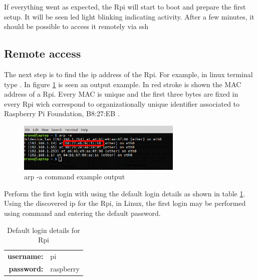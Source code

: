 If everything went as expected, the \gls{Rpi} will start to boot and prepare the first setup. It will be seen led light blinking indicating activity. After a few minutes, it should be possible to access it remotely via ssh


\subsection{Remote access}
The next step is to find the ip address of the \gls{Rpi}. For example, in linux terminal type . In figure \ref{arp_example} is seen an output example. In red stroke is shown the \gls{MAC} address of a \gls{Rpi}. Every \gls{MAC} is unique and the first three bytes are fixed in every \gls{Rpi} wich correspond to organizationally unique identifier \cite{mac_wiki} associated to Raspberry Pi Foundation, B8:27:EB \cite{wireshark_mac}.

\begin{figure}[hb]
	\centering
	\includegraphics[width=0.7\textwidth]{figures/arp_example}
	\caption{arp -a command example output}
	\label{arp_example}
\end{figure}

Perform the first login with using the default login details as shown in table \ref{tab:default_login}.
Using the discovered ip for the \gls{Rpi}, in Linux, the first login  may be performed using  command and entering the default password.

\begin{table}[h]
	\centering
	\begin{tabular}{rl}
		\toprule
		\textbf{username:}& pi\\
		\textbf{password:}& raspberry\\
		\bottomrule
	\end{tabular}
	\caption{Default login details for \gls{Rpi}}
	\label{tab:default_login}
\end{table}

